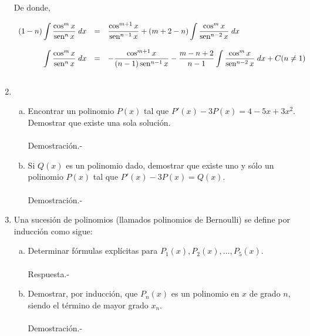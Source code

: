 \begin{enumerate}[\bfseries 1.]
	De donde,

	$$
	\begin{array}{rcl}
	    (1-n)\displaystyle\int \dfrac{\cos^m x}{\mathop{\mbox{\normalfont sen}}\nolimits^n x}\; dx &=& \dfrac{\cos^{m+1}x}{\mathop{\mbox{\normalfont sen}}\nolimits^{n-1}x}+(m+2-n)\displaystyle\int \dfrac{\cos^m x}{\mathop{\mbox{\normalfont sen}}\nolimits^{n-2}x}\; dx\\\\
	    \displaystyle\int \dfrac{\cos^m x}{\mathop{\mbox{\normalfont sen}}\nolimits^n x}\; dx &=& -\dfrac{\cos^{m+1}x}{(n-1)\mathop{\mbox{\normalfont sen}}\nolimits^{n-1}x}-\dfrac{m-n+2}{n-1}\displaystyle\int \dfrac{\cos^m x}{\mathop{\mbox{\normalfont sen}}\nolimits^{n-2}x}\; dx + C (n\neq 1)\\\\
	\end{array}
	$$
	\vspace{0.5cm}

    \item 
	\begin{enumerate}[a)]

	    \item Encontrar un polinomio $P(x)$ tal que $P'(x)-3P(x)=4-5x+3x^2$. Demostrar que existe una sola solución.\\\\
		Demostración.-\;

	    \item Si $Q(x)$ es un polinomio dado, demostrar que existe uno y sólo un polinomio $P(x)$ tal que $P'(x)-3P(x)=Q(x)$.\\\\
		Demostración.-\;

	\end{enumerate}

    \item Una sucesión de polinomios (llamados polinomios de Bernoulli) se define por inducción como sigue:

	\begin{enumerate}[a)]

	    \item Determinar fórmulas explícitas para $P_1(x),P_2(x),\ldots , P_5(x)$.\\\\
		Respuesta.-\;

	    \item Demostrar, por inducción, que $P_n(x)$ es un polinomio en $x$ de grado $n$, siendo el término de mayor grado $x_n$.\\\\
		Demostración.-\;


\end{enumerate}
\end{enumerate}
